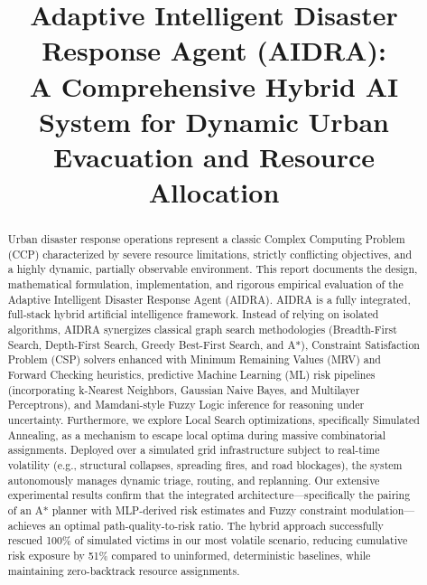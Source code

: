 \documentclass[conference]{IEEEtran}
\begin{document}
\title{Adaptive Intelligent Disaster Response Agent (AIDRA):\\
A Comprehensive Hybrid AI System for Dynamic Urban Evacuation and Resource Allocation}

\author{
}

\maketitle

\begin{abstract}
Urban disaster response operations represent a classic Complex Computing Problem (CCP) characterized by severe resource limitations, strictly conflicting objectives, and a highly dynamic, partially observable environment. This report documents the design, mathematical formulation, implementation, and rigorous empirical evaluation of the Adaptive Intelligent Disaster Response Agent (AIDRA). AIDRA is a fully integrated, full-stack hybrid artificial intelligence framework. Instead of relying on isolated algorithms, AIDRA synergizes classical graph search methodologies (Breadth-First Search, Depth-First Search, Greedy Best-First Search, and A*), Constraint Satisfaction Problem (CSP) solvers enhanced with Minimum Remaining Values (MRV) and Forward Checking heuristics, predictive Machine Learning (ML) risk pipelines (incorporating k-Nearest Neighbors, Gaussian Naive Bayes, and Multilayer Perceptrons), and Mamdani-style Fuzzy Logic inference for reasoning under uncertainty. Furthermore, we explore Local Search optimizations, specifically Simulated Annealing, as a mechanism to escape local optima during massive combinatorial assignments. Deployed over a simulated grid infrastructure subject to real-time volatility (e.g., structural collapses, spreading fires, and road blockages), the system autonomously manages dynamic triage, routing, and replanning. Our extensive experimental results confirm that the integrated architecture—specifically the pairing of an A* planner with MLP-derived risk estimates and Fuzzy constraint modulation—achieves an optimal path-quality-to-risk ratio. The hybrid approach successfully rescued 100\% of simulated victims in our most volatile scenario, reducing cumulative risk exposure by 51\% compared to uninformed, deterministic baselines, while maintaining zero-backtrack resource assignments.
\end{abstract}
\end{document}
